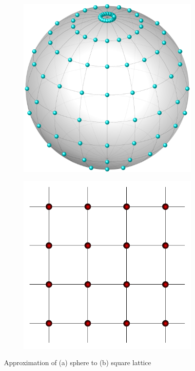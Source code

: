 \documentclass[10pt,letterpaper]{article}
\begin{document}
\begin{figure}[H]
	\centering
	\begin{subfigure}[b]{0.45\textwidth}
		\centering
		\includegraphics[scale=0.15]{latticeMid.pdf}
		\caption{          }
		\label{fig:gull}	
	\end{subfigure}
	\begin{subfigure}[b]{0.3\textwidth}
		\centering
		\includegraphics[scale=0.45]{squarelatticeMid.pdf}
		\caption{       }
		\label{fig:gull}	
	\end{subfigure}
	\caption{Approximation of (a) sphere to (b) square lattice}
\end{figure}
\end{document}

